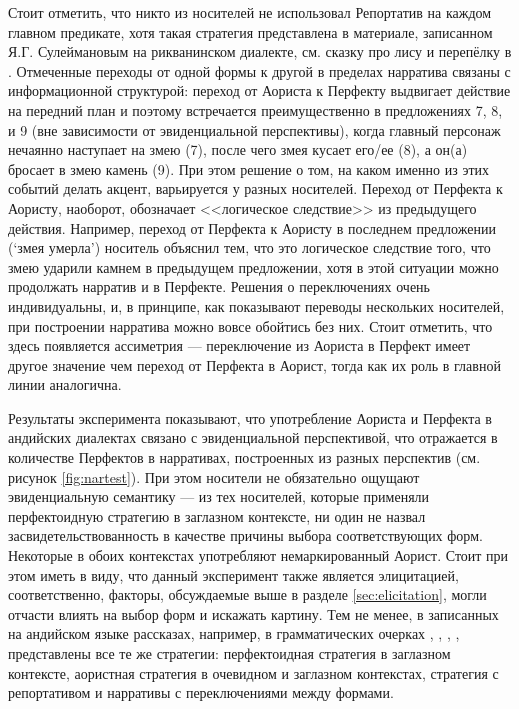 Стоит отметить, что никто из носителей не использовал Репортатив на каждом главном предикате, хотя такая стратегия представлена в материале, записанном Я.Г. Сулеймановым на рикванинском диалекте, см. сказку про лису и перепёлку в \citep[423]{sulejmanov1957}. Отмеченные переходы от одной формы к другой в пределах нарратива связаны с информационной структурой: переход от Аориста к Перфекту выдвигает действие на передний план и поэтому встречается преимущественно в предложениях 7, 8, и 9 (вне зависимости от эвиденциальной перспективы), когда главный персонаж нечаянно наступает на змею (7), после чего змея кусает его/ее (8), а он(а) бросает в змею камень (9). При этом решение о том, на каком именно из этих событий делать акцент, варьируется у разных носителей. Переход от Перфекта к Аористу, наоборот, обозначает <<логическое следствие>> из предыдущего действия. Например, переход от Перфекта к Аористу в последнем предложении (`змея умерла') носитель объяснил тем, что это логическое следствие того, что змею ударили камнем в предыдущем предложении, хотя в этой ситуации можно продолжать нарратив и в Перфекте. Решения о переключениях очень индивидуальны, и, в принципе, как показывают переводы нескольких носителей, при построении нарратива можно вовсе обойтись без них. Стоит отметить, что здесь появляется ассиметрия --- переключение из Аориста в Перфект имеет другое значение чем переход от Перфекта в Аорист, тогда как их роль в главной линии аналогична.
\par Результаты эксперимента показывают, что употребление Аориста и Перфекта в андийских диалектах связано с эвиденциальной перспективой, что отражается в количестве Перфектов в нарративах, построенных из разных перспектив (см. рисунок \ref{fig:nartest}). При этом носители не обязательно ощущают эвиденциальную семантику --- из тех носителей, которые применяли перфектоидную стратегию в заглазном контексте, ни один не назвал засвидетельствованность в качестве причины выбора соответствующих форм. Некоторые в обоих контекстах употребляют немаркированный Аорист. Стоит при этом иметь в виду, что данный эксперимент также является элицитацией, соответственно, факторы, обсуждаемые выше в разделе \ref{sec:elicitation}, могли отчасти влиять на выбор форм и искажать картину. Тем не менее, в записанных на андийском языке рассказах, например, в грамматических очерках \citep{dirr1906}, \citep{sulejmanov1957}, \citep{tsertsvadze65}, \citep{salimov2010}, представлены все те же стратегии: перфектоидная стратегия в заглазном контексте, аористная стратегия в очевидном и заглазном контекстах, стратегия с репортативом и нарративы с переключениями между формами. 

